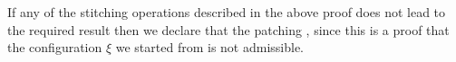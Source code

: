 \documentclass[12pt]{memoir}
\newcommand{\fld}[1]{\ensuremath{\textit{#1}}}
\newcommand{\R}{R}
\newcommand{\Addr}{\fld{Addr}}
\newcommand{\cAddr}{\fld{cAddr}}
\newcommand{\cDrift}{\fld{cDrift}}
\newcommand{\front}{\mathrm{front}}
\newcommand{\TransferSw}{\mathrm{TransferSw}}
\begin{document}
\begin{definition}\label{def:patching-failure}
If any of the stitching operations described in the above proof
does not lead to the required result then we
declare that the patching , since this is 
a proof that the configuration \( \xi \) we started from is not admissible.
\end{definition}




\end{document}
